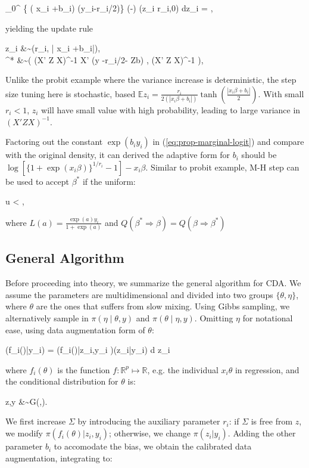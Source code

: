 \documentclass[10pt]{article}
\newcommand{\xbeta}{ x_i \beta}
\newcommand{\be}{\begin{equs}}
\newcommand{\ee}{\end{equs}}
\newcommand{\bb}[1]{\mathbb{#1}}
\DeclareMathOperator{\No}{No}
\DeclareMathOperator{\PG}{PG}
\begin{document}
\be
\int_{0}^{\infty}  \exp\{ (\xbeta+b_i) (y_i-r_i/2)\} \exp(-\frac{z_i (\xbeta+b_i)^2}{2}) \PG(z_i \mid r_i,0) dz_i =  ,
\label{eq:prop-marginal-logit}
\ee
yielding the update rule 

\be
 z_i &\sim {\PG}(r_i, |\xbeta+b_i|),\\
\beta^* &\sim \No \left(  (X' Z X)^{-1}  X'  (y -r_i/2- Zb) ,  (X' Z X)^{-1}  \right),
\ee

Unlike the probit example where the variance increase is deterministic, the step size tuning here is stochastic, based $\bb{E}z_i= \frac{r_i}{2 (|\xbeta+b_i|)}\tanh(\frac{|\xbeta+b_i|}{2})$. With small $r_i<1$, $z_i$ will have small value with high probability, leading to large variance in $(X' Z X)^{-1}$.

Factoring out the constant $\exp(b_i y_i)$ in (\ref{eq:prop-marginal-logit}) and compare with the original density, it can derived the adaptive form for $b_i$ should be $\log[  \{1+\exp(\xbeta)\}^{1/r_i} -1] - \xbeta$. Similar to probit example, M-H step can be used to accept $\beta^*$ if the uniform:

\be
u < \frac{\prod_i L(\xbeta^*) Q(\beta^* \Rightarrow \beta) }{\prod_i L(\xbeta)Q(\beta \Rightarrow \beta^*)},
\ee
where $L(a)=\frac{\exp(a)y_i}{1+\exp(a)}$ and $Q(\beta^* \Rightarrow \beta) =Q(\beta\Rightarrow \beta^* ) $

\subsection{General Algorithm}

Before proceeding into theory, we summarize the general algorithm for CDA. We assume the parameters are multidimensional and divided into two groups $\{ \theta, \eta\}$, where $\theta$ are the ones that suffers from slow mixing. Using Gibbs sampling, we alternatively sample in $\pi(\eta\mid\theta, y)$ and $\pi(\theta\mid \eta,y)$. Omitting $\eta$ for notational ease, using data augmentation form of  $\theta$:

\be \label{eq:da_decomposition}
\pi(f_i(\theta)|y_i) = \int \pi\left(f_i(\theta)|z_i,y_i \right)\pi(z_i|y_i) d z_i
\ee
where $f_i(\theta)$ is the function $f:\bb R^p \mapsto \bb R$, e.g. the individual $x_i\theta$ in regression, and the conditional distribution for $\theta$ is:

\be
\theta \mid z,y &\sim G(\mu,\Sigma).
\ee
We first increase $\Sigma$ by introducing the auxiliary parameter $r_i$: if $\Sigma$ is free from $z$, we modify $\pi\left(f_i(\theta)|z_i,y_i \right)$; otherwise, we change $\pi(z_i|y_i)$. Adding the other parameter $b_i$ to accomodate the bias, we obtain the calibrated data augmentation, integrating to:
\end{document}
